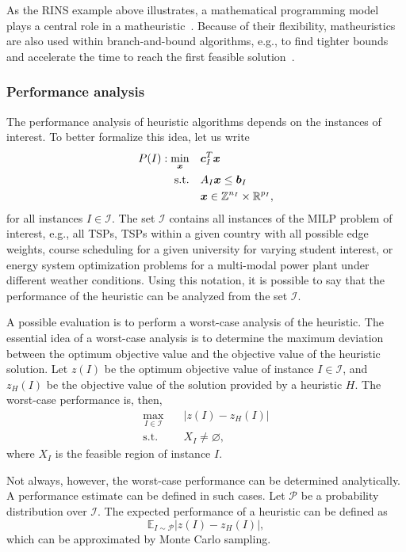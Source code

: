 As the RINS example above illustrates, a mathematical programming model plays a central role in a matheuristic~\cite{fischettiMatheuristics2016}.
Because of their flexibility, matheuristics are also used within branch-and-bound algorithms, e.g., to find tighter bounds and accelerate the time to reach the first feasible solution~\cite{fischettiMatheuristics2016,maniezzoMatheuristicsAlgorithmsImplementations2021}.

\subsubsection{Performance analysis}

The performance analysis of heuristic algorithms depends on the instances of interest.
To better formalize this idea, let us write
\begin{align*}
    P(I): \min_{\bm{x}} \quad & \bm{c}_I^{T}\bm{x} \\
    \textrm{s.t.} \quad & A_I\bm{x} \le \bm{b}_I \\
      & \bm{x}\in \mathbb{Z}^{n_I}\times \mathbb{R}^{p_I}
,\end{align*}
for all instances $I\in \mathcal{I}$.
The set $\mathcal{I}$ contains all instances of the MILP problem of interest, e.g., all TSPs, TSPs within a given country with all possible edge weights, course scheduling for a given university for varying student interest, or energy system optimization problems for a multi-modal power plant under different weather conditions.
Using this notation, it is possible to say that the performance of the heuristic can be analyzed from the set $\mathcal{I}$.

A possible evaluation is to perform a worst-case analysis of the heuristic.
The essential idea of a worst-case analysis is to determine the maximum deviation between the optimum objective value and the objective value of the heuristic solution. 
Let $z(I)$ be the optimum objective value of instance $I\in \mathcal{I}$, and $z_H(I)$ be the objective value of the solution provided by a heuristic $H$.
The worst-case performance is, then,
\begin{equation}
    \begin{split}
	\max_{I\in \mathcal{I}} \quad& |z(I) - z_H(I)| \\
	\textrm{s.t.} \quad& X_I \neq \varnothing
    ,\end{split}
\end{equation}
where $X_I$ is the feasible region of instance $I$.

Not always, however, the worst-case performance can be determined analytically.
A performance estimate can be defined in such cases.
Let $\mathcal{P}$ be a probability distribution over $\mathcal{I}$.
The expected performance of a heuristic can be defined as \[
    \mathbb{E}_{I\sim \mathcal{P}} |z(I) - z_H(I)|
,\] which can be approximated by Monte Carlo sampling.




